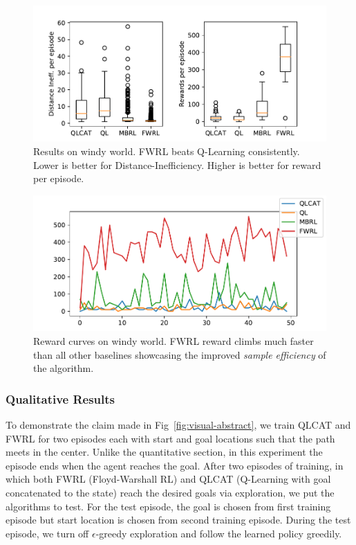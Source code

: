 \begin{figure}
  \includegraphics[width=\columnwidth]{./media/metrics-windy-world.pdf}
  \caption{Results on windy world. FWRL beats Q-Learning
    consistently. Lower is better for Distance-Inefficiency. Higher
    is better for reward per episode. }
  \label{fig:ql-fw-windy-world-results}%
\end{figure}

\begin{figure}
  \includegraphics[width=\columnwidth]{./media/rewards-metrics-windy-world.pdf}
  \caption{Reward curves on windy world. FWRL reward climbs much
    faster than all other baselines showcasing the improved \emph{sample
      efficiency} of the algorithm.}
  \label{fig:ql-fw-windy-world-reward-curves}%
\end{figure}


\subsubsection{Qualitative Results}
To demonstrate the claim made in Fig~\ref{fig:visual-abstract}, we train QLCAT
and FWRL for two episodes each with start and goal locations such that the path
meets in the center. Unlike the quantitative section, in this experiment the
episode ends when the agent reaches the goal.
After two episodes of training, in which both FWRL (Floyd-Warshall RL) and QLCAT
(Q-Learning with goal concatenated to the state) reach the desired
goals via exploration, we put the algorithms to test.
For the test episode, the goal is chosen from first training episode but start
location is chosen from second training episode.
During the test episode,
we turn off $\epsilon$-greedy exploration and follow the learned policy
greedily.

